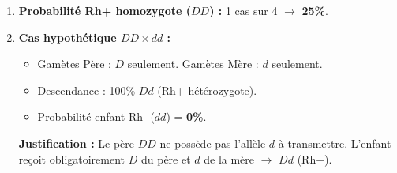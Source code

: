 \documentclass[11pt]{article}
\begin{document}
\begin{exoresolu}
\begin{enumerate}
    \item \textbf{Probabilité Rh+ homozygote ($DD$) :} 1 cas sur 4 $\rightarrow$ \textbf{25\%}.
    \item \textbf{Cas hypothétique $DD \times dd$ :} 
    \begin{itemize}
        \item Gamètes Père : $D$ seulement. Gamètes Mère : $d$ seulement.
        \item Descendance : 100\% $Dd$ (Rh+ hétérozygote).
        \item Probabilité enfant Rh- ($dd$) = \textbf{0\%}.
    \end{itemize}
    \textbf{Justification :} Le père $DD$ ne possède pas l'allèle $d$ à transmettre. L'enfant reçoit obligatoirement $D$ du père et $d$ de la mère $\rightarrow$ $Dd$ (Rh+).
\end{enumerate}
\end{exoresolu}
\end{document}
